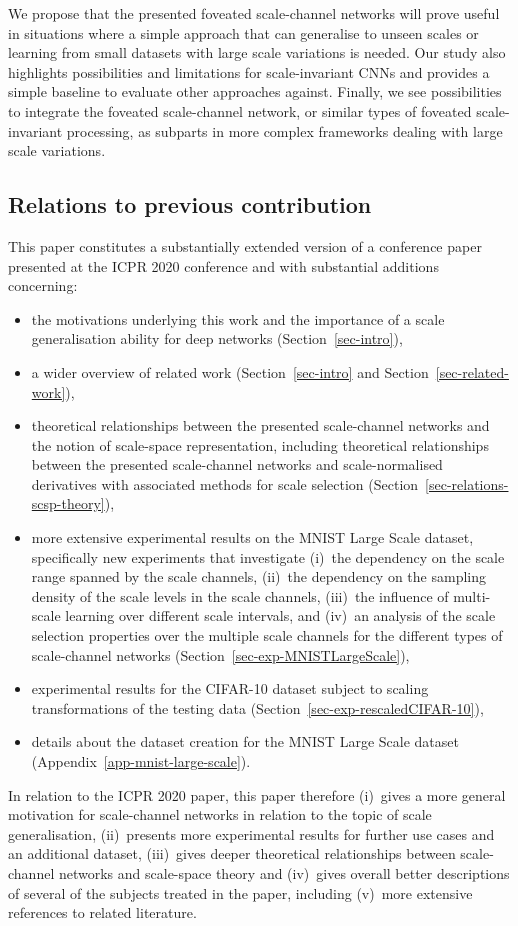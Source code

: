 \documentclass[twocolumn,runningheads]{svjour3}
\begin{document}
We propose that the presented foveated scale-channel networks
will prove useful in situations where a simple approach that can 
generalise to unseen scales or learning from small datasets with 
large scale variations is needed. Our study also highlights 
possibilities and limitations for scale-invariant CNNs and 
provides a simple baseline to evaluate other approaches against. 
Finally, we see possibilities to integrate the foveated scale-channel 
network, or similar types of foveated scale-invariant processing, 
as subparts in more complex frameworks dealing with large scale variations.
 
\subsection{Relations to previous contribution}

This paper constitutes a substantially extended version of a
conference paper presented at the ICPR 2020 conference \cite{JanLin21-ICPR} 
and with substantial additions concerning:
\begin{itemize}
\item
  the motivations underlying this work and the importance of a scale
  generalisation ability for deep networks (Section~\ref{sec-intro}),
\item 
  a wider overview of related work (Section~\ref{sec-intro} and Section~\ref{sec-related-work}),
\item 
  theoretical relationships between the presented scale-channel
  networks and the notion of scale-space representation, including theoretical relationships between the presented scale-channel
  networks and scale-normalised derivatives with associated methods
  for scale selection
  (Section~\ref{sec-relations-scsp-theory}),
\item
  more extensive experimental results on the MNIST Large Scale dataset,
  specifically new experiments that investigate (i)~the dependency on the
  scale range spanned by the scale channels, (ii)~the dependency on the sampling density of
  the scale levels in the scale channels, (iii)~the influence of multi-scale
  learning over different scale intervals, and (iv)~an analysis of the scale selection
  properties over the multiple scale channels for the different types
  of scale-channel networks (Section~\ref{sec-exp-MNISTLargeScale}),
\item
  experimental results for the CIFAR-10 dataset subject to scaling
  transformations of the testing data
  (Section~\ref{sec-exp-rescaledCIFAR-10}),
\item
  details about the dataset creation for the MNIST Large Scale dataset
  (Appendix~\ref{app-mnist-large-scale}).
\end{itemize}
In relation to the ICPR 2020 paper, this paper therefore (i)~gives a more
general motivation for scale-channel networks in relation to the topic 
of scale generalisation, (ii)~presents more experimental results for further use
cases and an additional dataset, (iii)~gives deeper theoretical relationships
between scale-channel networks and scale-space theory and (iv)~gives 
overall better descriptions of several of the subjects 
treated in the paper, including (v)~more extensive references to related
literature.
\end{document}
